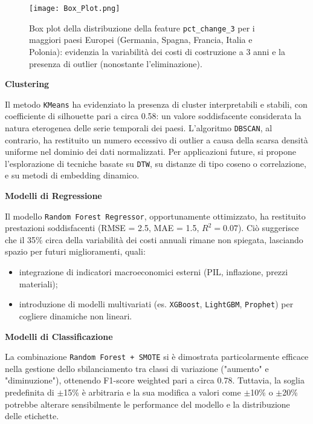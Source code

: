 \documentclass[conference]{IEEEtran}
\begin{document}
\begin{figure}[H]
\centering
\texttt{[image: Box\_Plot.png]}
\caption{Box plot della distribuzione della feature \texttt{pct\_change\_3} per i maggiori paesi Europei (Germania, Spagna, Francia, Italia e Polonia): evidenzia la variabilità dei costi di costruzione a 3 anni e la presenza di outlier (nonostante l'eliminazione).}
\label{fig:box-plot}
\end{figure}

\vspace{1em}\noindent\textbf{Clustering}

Il metodo \texttt{KMeans} ha evidenziato la presenza di cluster interpretabili e stabili, con coefficiente di silhouette pari a circa 0.58: un valore soddisfacente considerata la natura eterogenea delle serie temporali dei paesi. L’algoritmo \texttt{DBSCAN}, al contrario, ha restituito un numero eccessivo di outlier a causa della scarsa densità uniforme nel dominio dei dati normalizzati. Per applicazioni future, si propone l’esplorazione di tecniche basate su \texttt{DTW}, su distanze di tipo coseno o correlazione, e su metodi di embedding dinamico.

\vspace{1em}\noindent\textbf{Modelli di Regressione}

Il modello \texttt{Random Forest Regressor}, opportunamente ottimizzato, ha restituito prestazioni soddisfacenti (RMSE = 2.5, MAE = 1.5, $R^2 = 0.07$). Ciò suggerisce che il 35\% circa della variabilità dei costi annuali rimane non spiegata, lasciando spazio per futuri miglioramenti, quali:

\begin{itemize} \item integrazione di indicatori macroeconomici esterni (PIL, inflazione, prezzi materiali); \item introduzione di modelli multivariati (es. \texttt{XGBoost}, \texttt{LightGBM}, \texttt{Prophet}) per cogliere dinamiche non lineari. \end{itemize}

\vspace{1em}\noindent\textbf{Modelli di Classificazione}

La combinazione \texttt{Random Forest + SMOTE} si è dimostrata particolarmente efficace nella gestione dello sbilanciamento tra classi di variazione ("aumento" e "diminuzione"), ottenendo F1-score weighted pari a circa 0.78. Tuttavia, la soglia predefinita di $\pm$15\% è arbitraria e la sua modifica a valori come $\pm$10\% o $\pm$20\% potrebbe alterare sensibilmente le performance del modello e la distribuzione delle etichette.
\end{document}
